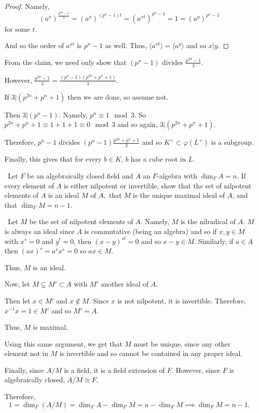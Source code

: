 \documentclass[12pt]{Qual}
\begin{document}
\begin{solution}
\begin{claim}
\begin{proof}
Namely, $$(a^x)^\frac{p^{3n}-1}{3}=(a^x)^{(p^n-1)t}=(a^{xt})^{p^n-1}=1=(a^y)^{p^n-1}$$ for some $t.$

And so the order of $a^{xt}$ is $p^n-1$ as well. Thus, $\langle a^{xt}\rangle=\langle a^y\rangle$ and so $x|y.$
\end{proof}
\end{claim}

From the claim, we need only show that $(p^n-1)$ divides $\frac{p^{3n}-1}{3}$.

However, $\frac{p^{3n}-1}{3}=\frac{(p^n-1)(p^{2n}+p^n+1)}{3}$.

If $3|(p^{2n}+p^n+1)$ then we are done, so assume not.

Then $3|(p^n-1)$. Namely, $p^n\equiv 1\mod 3$. So $p^{2n}+p^n+1\equiv 1+1+1\equiv 0\mod 3$ and so again, $3|(p^{2n}+p^n+1)$.

Therefore, $p^n-1$ divides $(p^n-1)\frac{p^{2n}+p^n+1}{3}$ and so $K^\times\subset\varphi(L^\times)$ is a subgroup.

Finally, this gives that for every $b\in K$, $b$ has a cube root in $L$.
\end{solution}
\newpage



\begin{problem} $\,$
Let $F$ be an algebraically closed field and $A$ an $F$-algebra with $\dim_FA=n$. If every element of $A$ is either nilpotent or invertible, show that the set of nilpotent elements of $A$ is an ideal $M$ of $A,$ that $M$ is the unique maximal ideal of $A$, and that $\dim_FM=n-1.$
\end{problem}


\begin{solution}$\,$
Let $M$ be the set of nilpotent elements of $A$. Namely, $M$ is the nilradical of $A$. $M$ is always an ideal since $A$ is commutative (being an algebra) and so if $x,y\in M$ with $x^s=0$ and $y^t=0$, then $(x-y)^{st}=0$ and so $x-y\in M.$ Similarly, if $a\in A$ then $(ax)^s=a^sx^s=0$ so $ax\in M$.

Thus, $M$ is an ideal.

Now, let $M\subsetneq M'\subset A$ with $M'$ another ideal of $A$.

Then let $x\in M'$ and $x\notin M$. Since $x$ is not nilpotent, it is invertible. Therefore, $x^{-1}x=1\in M'$ and so $M'=A$.

Thus, $M$ is maximal.

Using this same argument, we get that $M$ must be unique, since any other element not in $M$ is invertible and so cannot be contained in any proper ideal.

Finally, since $A/M$ is a field, it is a field extension of $F$. However, since $F$ is algebraically closed, $A/M\cong F$.

Therefore, $$1=\dim_F(A/M)=\dim_FA-\dim_FM=n-\dim_FM\implies \dim_FM=n-1.$$
\end{solution}
\newpage
\end{document}
